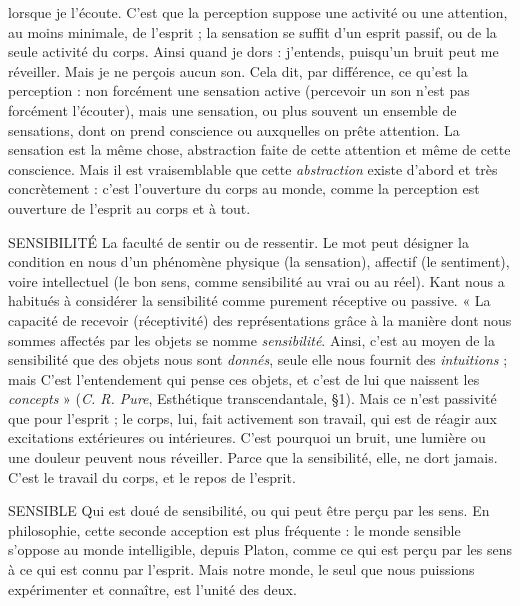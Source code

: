 lorsque je l'écoute. C’est que la perception suppose une activité ou une attention,
au moins minimale, de l'esprit ; la sensation se suffit d’un esprit passif, ou
de la seule activité du corps. Ainsi quand je dors : j'entends, puisqu’un bruit
peut me réveiller. Mais je ne perçois aucun son. Cela dit, par différence, ce
qu'est la perception : non forcément une sensation active (percevoir un son
n'est pas forcément l’écouter), mais une sensation, ou plus souvent un
ensemble de sensations, dont on prend conscience ou auxquelles on prête
attention. La sensation est la même chose, abstraction faite de cette attention et
même de cette conscience. Mais il est vraisemblable que cette {\it abstraction} existe
d’abord et très concrètement : c’est l’ouverture du corps au monde, comme la
perception est ouverture de l’esprit au corps et à tout.

SENSIBILITÉ La faculté de sentir ou de ressentir. Le mot peut désigner la
condition en nous d’un phénomène physique (la sensation),
affectif (le sentiment), voire intellectuel (le bon sens, comme sensibilité au vrai
ou au réel). Kant nous a habitués à considérer la sensibilité comme purement
réceptive ou passive. « La capacité de recevoir (réceptivité) des représentations
grâce à la manière dont nous sommes affectés par les objets se nomme {\it sensibilité}.
Ainsi, c’est au moyen de la sensibilité que des objets nous sont {\it donnés}, seule
elle nous fournit des {\it intuitions} ; mais C’est l’entendement qui pense ces objets,
et c'est de lui que naissent les {\it concepts} » ({\it C. R. Pure}, Esthétique transcendantale,
\S 1). Mais ce n’est passivité que pour l'esprit ; le corps, lui, fait activement son
travail, qui est de réagir aux excitations extérieures ou intérieures. C’est pourquoi
un bruit, une lumière ou une douleur peuvent nous réveiller. Parce que la
sensibilité, elle, ne dort jamais. C’est le travail du corps, et le repos de l'esprit.

SENSIBLE Qui est doué de sensibilité, ou qui peut être perçu par les sens.
En philosophie, cette seconde acception est plus fréquente : le
monde sensible s'oppose au monde intelligible, depuis Platon, comme ce qui
est perçu par les sens à ce qui est connu par l’esprit. Mais notre monde, le seul
que nous puissions expérimenter et connaître, est l’unité des deux.


